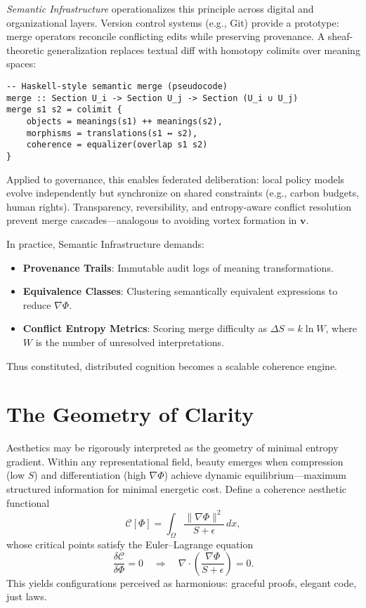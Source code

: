 \documentclass[12pt,a4paper]{article}
\begin{document}
\emph{Semantic Infrastructure} operationalizes this principle across digital and organizational layers. Version control systems (e.g., Git) provide a prototype: merge operators reconcile conflicting edits while preserving provenance. A sheaf-theoretic generalization replaces textual diff with homotopy colimits over meaning spaces:
\begin{verbatim}
-- Haskell-style semantic merge (pseudocode)
merge :: Section U_i -> Section U_j -> Section (U_i ∪ U_j)
merge s1 s2 = colimit {
    objects = meanings(s1) ++ meanings(s2),
    morphisms = translations(s1 ↔ s2),
    coherence = equalizer(overlap s1 s2)
}
\end{verbatim}
Applied to governance, this enables federated deliberation: local policy models evolve independently but synchronize on shared constraints (e.g., carbon budgets, human rights). Transparency, reversibility, and entropy-aware conflict resolution prevent merge cascades—analogous to avoiding vortex formation in $\bm{v}$.

In practice, Semantic Infrastructure demands:
\begin{itemize}
\item \textbf{Provenance Trails}: Immutable audit logs of meaning transformations.
\item \textbf{Equivalence Classes}: Clustering semantically equivalent expressions to reduce $\nabla \Phi$.
\item \textbf{Conflict Entropy Metrics}: Scoring merge difficulty as $\Delta S = k \ln W$, where $W$ is the number of unresolved interpretations.
\end{itemize}
Thus constituted, distributed cognition becomes a scalable coherence engine.

\section{The Geometry of Clarity}
Aesthetics may be rigorously interpreted as the geometry of minimal entropy gradient. Within any representational field, beauty emerges when compression (low $S$) and differentiation (high $\nabla \Phi$) achieve dynamic equilibrium—maximum structured information for minimal energetic cost. Define a coherence aesthetic functional
\begin{equation}
\mathcal{C}[\Phi] = \int_\Omega \frac{\|\nabla \Phi\|^2}{S + \epsilon} \, dx,
\label{eq:aesthetic-functional}
\end{equation}
whose critical points satisfy the Euler–Lagrange equation
\begin{equation}
\frac{\delta \mathcal{C}}{\delta \Phi} = 0 \quad \Rightarrow \quad
\nabla \cdot \left( \frac{\nabla \Phi}{S + \epsilon} \right) = 0.
\label{eq:euler-lagrange}
\end{equation}
This yields configurations perceived as harmonious: graceful proofs, elegant code, just laws.
\end{document}
